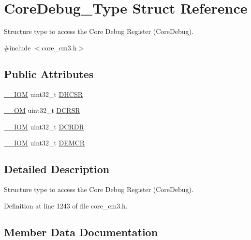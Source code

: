 \hypertarget{struct_core_debug___type}{}\section{Core\+Debug\+\_\+\+Type Struct Reference}
\label{struct_core_debug___type}


Structure type to access the Core Debug Register (Core\+Debug).  




{\ttfamily \#include $<$core\+\_\+cm3.\+h$>$}

\subsection*{Public Attributes}
\begin{DoxyCompactItemize}
\item 
\hyperlink{core__sc300_8h_ab6caba5853a60a17e8e04499b52bf691}{\+\_\+\+\_\+\+I\+OM} uint32\+\_\+t \hyperlink{struct_core_debug___type_ad63554e4650da91a8e79929cbb63db66}{D\+H\+C\+SR}
\item 
\hyperlink{core__sc300_8h_a0ea2009ed8fd9ef35b48708280fdb758}{\+\_\+\+\_\+\+OM} uint32\+\_\+t \hyperlink{struct_core_debug___type_af907cf64577eaf927dac6787df6dd98b}{D\+C\+R\+SR}
\item 
\hyperlink{core__sc300_8h_ab6caba5853a60a17e8e04499b52bf691}{\+\_\+\+\_\+\+I\+OM} uint32\+\_\+t \hyperlink{struct_core_debug___type_aab3cc92ef07bc1f04b3a3aa6db2c2d55}{D\+C\+R\+DR}
\item 
\hyperlink{core__sc300_8h_ab6caba5853a60a17e8e04499b52bf691}{\+\_\+\+\_\+\+I\+OM} uint32\+\_\+t \hyperlink{struct_core_debug___type_aeb3126abc4c258a858f21f356c0df6ee}{D\+E\+M\+CR}
\end{DoxyCompactItemize}


\subsection{Detailed Description}
Structure type to access the Core Debug Register (Core\+Debug). 

Definition at line 1243 of file core\+\_\+cm3.\+h.



\subsection{Member Data Documentation}
\mbox{\label{struct_core_debug___type_aab3cc92ef07bc1f04b3a3aa6db2c2d55}} 

